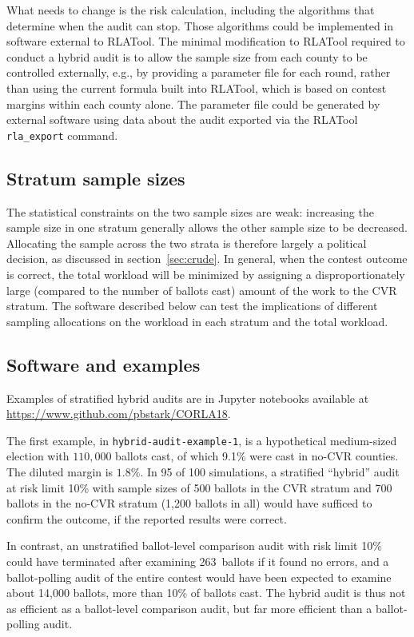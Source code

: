 \documentclass[runningheads]{llncs}
\begin{document}
What needs to change is the risk calculation, including the
algorithms that determine when the audit can stop.
Those algorithms could be implemented in software external to RLATool.
The minimal modification to RLATool required to conduct
a hybrid audit is to allow the sample size from each county to be controlled externally,
e.g., by providing a parameter file for each round,
rather than using the current formula built into RLATool, 
which is based on contest margins within each county alone.
The parameter file could be generated by external software using
data about the audit exported via the RLATool \texttt{rla\_export} command.

\subsection{Stratum sample sizes}
The statistical constraints on the two sample sizes are weak: increasing the
sample size in one stratum generally allows the other sample size to be decreased.
Allocating the sample across the two strata is therefore largely a political decision,
as discussed in section~\ref{sec:crude}.
In general, when the contest outcome is correct, the total workload will be minimized by 
assigning a disproportionately large (compared to the number of ballots cast) amount of 
the work to the CVR stratum.
The software described below can test the implications of different sampling allocations
on the workload in each stratum and the total workload.

\subsection{Software and examples}
Examples of stratified hybrid audits are in Jupyter notebooks available
at \url{https://www.github.com/pbstark/CORLA18}.

The first example, in \texttt{hybrid-audit-example-1}, is a hypothetical medium-sized election with 
$110,000$ ballots cast, of which 
9.1\% were cast in no-CVR counties. 
The diluted margin is $1.8\%$.
In 95 of 100 simulations, a stratified ``hybrid'' audit at risk limit 10\% with sample sizes of 500 ballots 
in the CVR stratum and 700 ballots in the no-CVR stratum
(1,200 ballots in all)
would have sufficed to confirm the outcome, if the reported results were correct.

In contrast, an unstratified ballot-level comparison audit with risk limit 10\% could have terminated
after examining 263~ballots if it found no errors, and a ballot-polling audit of the entire contest 
would have been expected to examine about 14,000 ballots, more than 10\% of ballots cast.
The hybrid audit is thus not as efficient as a ballot-level comparison audit, but far more efficient than
a ballot-polling audit.
\end{document}
